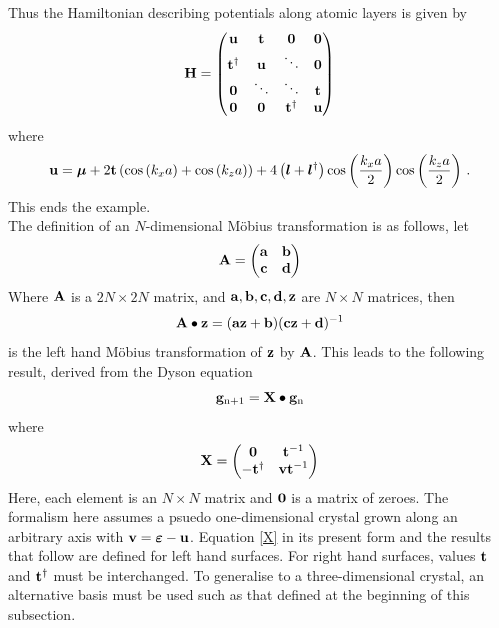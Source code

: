 \documentclass[a4paper, 12pt]{article}
\begin{document}
	Thus the Hamiltonian describing potentials along atomic layers is given by
	\begin{equation}
	\bf	H = \begin{pmatrix} \bf u&\bf t& \bf 0&\bf 0\\\bf t^\dagger&\bf u &\ddots&\bf 0\\\bf 0&\ddots&\ddots&\bf t\\\bf 0&\bf 0&\bf t^\dagger&\bf u\end{pmatrix}
	\end{equation}
	where 
	\begin{equation}
		{\bf u} = \bm \mu + 2{\bf t}\left(\cos\left(k_x a\right)+\cos\left(k_z a\right)\right) + 4\left(\bm l + \bm l^\dagger\right)\cos\left(\frac{k_xa}{2}\right)\cos\left(\frac{k_za}{2}\right)\,.
	\end{equation}
	This ends the example.
	\\[2mm] The definition of an $N$-dimensional M\"{o}bius transformation is as follows, let
\begin{equation}
\bf{A} = \begin{pmatrix} \bf{a}&\bf{b}\\ \bf{c}&\bf{d} \end{pmatrix}
\end{equation}
Where $\bf{A}$ is a $2N \times 2N$ matrix, and $\bf{a}, \bf{b}, \bf{c}, \bf{d}, \bf{z}$ are $N \times N$ matrices, then
\begin{equation}\label{LHMT}
\bf{A \bullet z} = (\bf{az} + \bf{b})(\bf{cz} + \bf{d})^{\rm -1}
\end{equation}
is the left hand M\"{o}bius transformation of $\bf z$ by $\bf A$.
This leads to the following result, derived from the Dyson equation
\begin{equation}
	{\bf g}_{{\rm n}+1} = {\bf X}\bullet {\bf g}_{\rm n}
\end{equation}
where
\begin{equation}\label{X}
	\bf{X} = \begin{pmatrix} \bf0&\bf{t}^{\rm{-1}}\\-\bf{t}^{\rm{\dag}}&\bf{vt}^{\rm{-1}} \end{pmatrix}
\end{equation}
Here, each element is an $N \times N$ matrix and $\bf{0}$ is a matrix of zeroes. The formalism here assumes a psuedo one-dimensional crystal grown along an arbitrary axis with ${\bf v} = \bm\varepsilon - {\bf u}$. Equation \eqref{X} in its present form and the results that follow are defined for left hand surfaces. For right hand surfaces, values $\bf{t}$ and $\bf{t}^{\rm{\dag}}$ must be interchanged.
To generalise to a three-dimensional crystal, an alternative basis must be used such as that defined at the beginning of this subsection.
\end{document}
